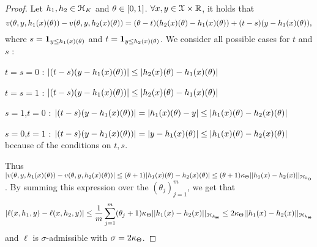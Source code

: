 \begin{proof}
  Let $h_1,h_2 \in \mathcal{H}_K$ and
  $\theta \in [0,1]$. $\forall x,y \in \mathcal{X} \times \mathbb{R}$, it holds that
  \begin{dmath*}[compact]
  \hcost(\hyperparameter,y,h_1(x)(\hyperparameter)) - \hcost(\hyperparameter,y , h_2(x)(\hyperparameter)) =
  (\hyperparameter -t)(h_2(x)(\hyperparameter) - h_1(x)(\hyperparameter)) + (t-s)(y-h_1(x)(\hyperparameter)),
  \end{dmath*}
  where $s = \mathbf{1}_{y \leq h_1(x)(\theta)}$ and
  $t = \mathbf{1}_{y \leq h_2(x)(\theta)}$. We consider all possible cases for
  $t$ and $s$ :
  \begin{compactitem}
    \item $t = s = 0$ : $|(t-s)(y-h_1(x)(\theta)) |
    \leq |h_2(x)(\theta) - h_1(x)(\theta)| $
    \item $t = s = 1$ : $|(t-s)(y-h_1(x)(\theta)) |
    \leq |h_2(x)(\theta) - h_1(x)(\theta)| $
    \item $s=1$,$t=0$ : $|(t-s)(y-h_1(x)(\theta)) | = |h_1(x)(\theta) - y| \leq
     |h_1(x)(\theta) - h_2(x)(\theta)| $
    \item $s=0$,$t=1$ : $|(t-s)(y-h_1(x)(\theta)) | = |y - h_1(x)(\theta)| \leq
    |h_1(x)(\theta) - h_2(x)(\theta)|$ because of the conditions on $t,s$.
  \end{compactitem}
  Thus $|v(\theta,y,h_1(x)(\theta)) - v(\theta,y , h_2(x)(\theta))| \leq
  (\theta + 1) | h_1(x)(\theta) - h_2(x)(\theta) | \leq (\theta + 1) \kappa_{\Theta}
  || h_1(x) - h_2(x) ||_{\mathcal{H}_{k_{\Theta}}}$.
  By summing this expression over the $(\theta_j)_{j=1}^m$, we get that
  \begin{dmath*}[compact]
  |\ell(x,h_1,y) - \ell(x,h_2,y)| \leq \frac{1}{m} \sum_{j=1}^m (\hyperparameter_j+1) \kappa_{\hyperparameterspace}
  || h_1(x) - h_2(x) ||_{\mcH_{k_{\hyperparameterspace}}} \leq
  2 \kappa_{\hyperparameterspace} ||h_1(x) - h_2(x) ||_{\mcH_{k_{\hyperparameterspace}}}
  \end{dmath*}
  and $\ell$ is $\sigma$-admissible with $\sigma = 2 \kappa_{\Theta}$.
\end{proof}

